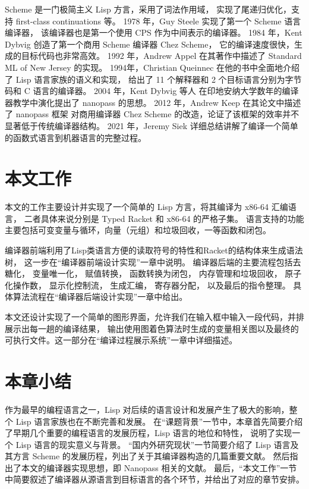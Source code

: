 Scheme 是一门极简主义 Lisp 方言，采用了词法作用域，
实现了尾递归优化，支持 first-class continuations 等。
1978 年，Guy Steele\cite{Steele_1978} 实现了第一个 Scheme 语言编译器，
该编译器也是第一个使用 CPS 作为中间表示的编译器。
1984 年，Kent Dybvig 创造了第一个商用 Scheme 编译器 Chez Scheme\cite{Dybvig_2006}，
它的编译速度很快，生成的目标代码也非常高效。
1992 年，Andrew Appel\cite{Appel_1992} 在其著作中描述了 Standard ML of New Jersey 的实现。
1994年，Christian Queinnec\cite{Queinnec_1996} 在他的书中全面地介绍了 Lisp 语言家族的语义和实现，
给出了 11 个解释器和 2 个目标语言分别为字节码和 C 语言的编译器。
2004 年，Kent Dybvig 等人\cite{Sarkar_Waddell_Dybvig_2004}
在印地安纳大学数年的编译器教学中演化提出了 nanopass 的思想。
2012 年，Andrew Keep\cite{Keep_Dybvig_2013} 在其论文中描述了 nanopass 框架
对商用编译器 Chez Scheme 的改造，论证了该框架的效率并不显著低于传统编译器结构。
2021 年，Jeremy Siek\cite{Siek_2022} 详细总结讲解了编译一个简单的函数式语言到机器语言的完整过程。

\section{本文工作}

本文的工作主要设计并实现了一个简单的 Lisp 方言，将其编译为 x86-64 汇编语言，
二者具体来说分别是 Typed Racket 和 x86-64 的严格子集。
语言支持的功能主要包括可变变量与循环，向量（元组）和垃圾回收，一等函数和闭包。

编译器前端利用了Lisp类语言方便的读取符号的特性和Racket的结构体来生成语法树，
这一步在“编译器前端设计实现”一章中说明。
编译器后端的主要流程包括去糖化，
变量唯一化，
赋值转换，
函数转换为闭包，
内存管理和垃圾回收，
原子化操作数，
显示化控制流，
生成汇编，
寄存器分配，
以及最后的指令整理。
具体算法流程在“编译器后端设计实现”一章中给出。

本文还设计实现了一个简单的图形界面，允许我们在输入框中输入一段代码，并排展示出每一趟的编译结果，
输出使用图着色算法时生成的变量相关图以及最终的可执行文件。这一部分在“编译过程展示系统”一章中详细描述。

\section{本章小结}

作为最早的编程语言之一，Lisp 对后续的语言设计和发展产生了极大的影响，整个 Lisp 语言家族也在不断完善和发展。
在“课题背景”一节中，本章首先简要介绍了早期几个重要的编程语言的发展历程，Lisp 语言的地位和特性，
说明了实现一个 Lisp 语言的现实意义与背景。
“国内外研究现状”一节简要介绍了 Lisp 语言及其方言 Scheme 的发展历程，列出了关于其编译器构造的几篇重要文献。
然后指出了本文的编译器实现思想，即 Nanopass 相关的文献。
最后，“本文工作”一节中简要叙述了编译器从源语言到目标语言的各个环节，并给出了对应的章节安排。
